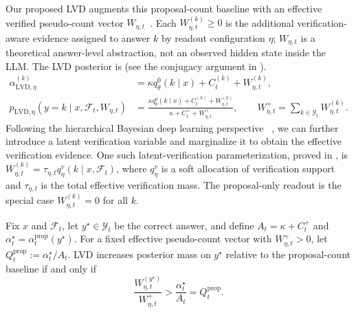 Our proposed LVD augments this proposal-count baseline with an effective verified
pseudo-count vector $W_{\eta,t}$~\cite{VIR}. Each $W_{\eta,t}^{(k)}\ge 0$ is the additional
verification-aware evidence assigned to answer $k$ by readout configuration
$\eta$; $W_{\eta,t}$ is a theoretical answer-level abstraction, not an observed
hidden state inside the LLM. The LVD posterior is (see the conjugacy argument in
).
\begin{equation}
\begin{aligned}
    \alpha_{\mathrm{LVD},\eta}^{(k)}
    &=\kappa q_\theta^0(k\mid x)+C_t^{(k)}+W_{\eta,t}^{(k)},\\
    p_{\mathrm{LVD},\eta}(y=k\mid x,\mathcal F_t,W_{\eta,t})
    &=\frac{\kappa q_\theta^0(k\mid x)+C_t^{(k)}+W_{\eta,t}^{(k)}}
    {\kappa+C_t^+ + W_{\eta,t}^+},
    \qquad
    W_{\eta,t}^+=\sum\nolimits_{k\in\mathcal Y_t}W_{\eta,t}^{(k)}.
    \label{eq:lvd_posterior}
\end{aligned}
\end{equation}
Following the hierarchical Bayesian deep learning perspective
~\citep{BDL,BDLSurvey,NPN}, we can further introduce a latent verification
variable and marginalize it to obtain the effective verification evidence.
One such latent-verification
parameterization, proved in , is
$W_{\eta,t}^{(k)}=\tau_{\eta,t}q_\eta^v(k\mid x,\mathcal F_t)$, where
$q_\eta^v$ is a soft allocation of verification support and $\tau_{\eta,t}$ is
the total effective verification mass. The proposal-only readout is the special
case $W_{\eta,t}^{(k)}=0$ for all $k$.

\begin{proposition}
\label{prop:verification_directed_drift}
Fix $x$ and $\mathcal F_t$, let $y^\star\in\mathcal Y_t$ be the correct answer,
and define $A_t=\kappa+C_t^+$ and
$\alpha_t^\star=\alpha_t^{\mathrm{prop}}(y^\star)$. For a fixed effective
pseudo-count vector with $W_{\eta,t}^+>0$, let
$Q_t^{\mathrm{prop}}:=\alpha_t^\star/A_t$. LVD increases posterior mass on
$y^\star$ relative to the proposal-count baseline if and only if
\begin{equation}
    \frac{W_{\eta,t}^{(y^\star)}}{W_{\eta,t}^+}
    >
    \frac{\alpha_t^\star}{A_t}
    =
    Q_t^{\mathrm{prop}}.
    \label{eq:lvd_positive_drift_ratio}
\end{equation}
\end{proposition}

